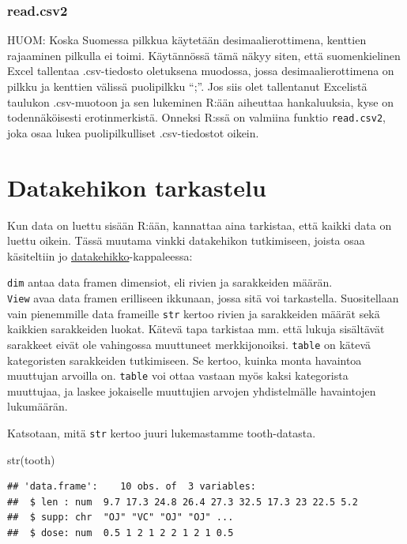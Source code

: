 \documentclass[
]{book}
\newenvironment{Shaded}{\begin{snugshade}}{\end{snugshade}}
\newcommand{\FunctionTok}[1]{\textcolor[rgb]{0.00,0.00,0.00}{#1}}
\newcommand{\NormalTok}[1]{#1}
\begin{document}
\hypertarget{read.csv2}{%
\subsubsection{read.csv2}\label{read.csv2}}

HUOM: Koska Suomessa pilkkua käytetään desimaalierottimena, kenttien rajaaminen pilkulla ei toimi. Käytännössä tämä näkyy siten, että suomenkielinen Excel tallentaa .csv-tiedosto oletuksena muodossa, jossa desimaalierottimena on pilkku ja kenttien välissä puolipilkku ``;''. Jos siis olet tallentanut Excelistä taulukon .csv-muotoon ja sen lukeminen R:ään aiheuttaa hankaluuksia, kyse on todennäköisesti erotinmerkistä. Onneksi R:ssä on valmiina funktio \texttt{read.csv2}, joka osaa lukea puolipilkulliset .csv-tiedostot oikein.

\hypertarget{datakehikon-tarkastelu}{%
\section{Datakehikon tarkastelu}\label{datakehikon-tarkastelu}}

Kun data on luettu sisään R:ään, kannattaa aina tarkistaa, että kaikki data on luettu oikein. Tässä muutama vinkki datakehikon tutkimiseen, joista osaa käsiteltiin jo \protect\hyperlink{data-frame}{datakehikko}-kappaleessa:

\texttt{dim} antaa data framen dimensiot, eli rivien ja sarakkeiden määrän.\\
\texttt{View} avaa data framen erilliseen ikkunaan, jossa sitä voi tarkastella. Suositellaan vain pienemmille data frameille
\texttt{str} kertoo rivien ja sarakkeiden määrät sekä kaikkien sarakkeiden luokat. Kätevä tapa tarkistaa mm. että lukuja sisältävät sarakkeet eivät ole vahingossa muuttuneet merkkijonoiksi.
\texttt{table} on kätevä kategoristen sarakkeiden tutkimiseen. Se kertoo, kuinka monta havaintoa muuttujan arvoilla on. \texttt{table} voi ottaa vastaan myös kaksi kategorista muuttujaa, ja laskee jokaiselle muuttujien arvojen yhdistelmälle havaintojen lukumäärän.

Katsotaan, mitä \texttt{str} kertoo juuri lukemastamme tooth-datasta.

\begin{Shaded}
\begin{Highlighting}[]
\FunctionTok{str}\NormalTok{(tooth)}
\end{Highlighting}
\end{Shaded}

\begin{verbatim}
## 'data.frame':    10 obs. of  3 variables:
##  $ len : num  9.7 17.3 24.8 26.4 27.3 32.5 17.3 23 22.5 5.2
##  $ supp: chr  "OJ" "VC" "OJ" "OJ" ...
##  $ dose: num  0.5 1 2 1 2 2 1 2 1 0.5
\end{verbatim}
\end{document}
